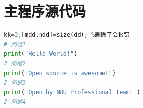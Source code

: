 \documentclass[a4paper,10pt]{my_paper}
\numberwithin{equation}{section}
\begin{document}
\section{主程序源代码}

\begin{lstlisting}[language=Python]%设置不同语言即可。
kk=2;[mdd,ndd]=size(dd); %删除了会报错
# 问题1
print("Hello World!")
# 问题2
print("Open source is awesome!")
# 问题3
print("Open by NBU Professional Team" )
# 问题4

\end{lstlisting}
\end{document}
